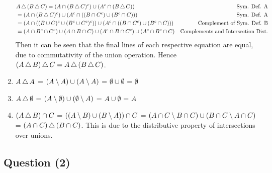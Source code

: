 \documentclass{article}
\begin{document}
\begin{enumerate}[label=(\roman*)]
        \begin{align*}
            & A \, \triangle \, (B \, \triangle \, C) = (A \cap (B \, \triangle \, C)^c) \cup (A^c \cap (B \, \triangle \, C)) & \text{Sym. Def. A} \\
            & = (A \cap (B \, \triangle \, C)^c) \cup (A^c \cap ((B \cap C^c) \cup (B^c \cap C))) & \text{Sym. Def. A} \\ 
            & = (A \cap ((B \cup C)^c \cup (B^c \cup C^c)^c)) \cup (A^c \cap ((B \cap C^c) \cup (B^c \cap C))) & \text{Complement of Sym. Def. B} \\ 
            & = (A \cap B^c \cap C^c) \cup (A \cap B \cap C) \cup (A^c \cap B \cap C^c) \cup (A^c \cap B^c \cap C) & \text{Complements and Intersection Dist.}
        \end{align*}
        Then it can be seen that the final lines of each respective equation are equal, due to commutativity of the union operation. Hence $(A \, \triangle \, B) \, \triangle \, C = A \, \triangle \, (B \, \triangle \, C)$.
    \item $A \, \triangle \, A$ = $(A \setminus A) \cup (A \setminus A)$ = $\emptyset \cup \emptyset$ = $\emptyset$
    \item $A \, \triangle \, \emptyset$ = $(A \setminus \emptyset) \cup (\emptyset \setminus A)$ = $A \cup \emptyset$ = $A$
    \item $(A \, \triangle \, B) \cap C$ = $((A \setminus B) \cup (B \setminus A)) \cap C$ = $(A \cap C \setminus B \cap C) \cup (B \cap C \setminus A \cap C)$ = $(A \cap C) \, \triangle \, (B \cap C)$. This is due to the distributive property of intersections over unions.
\end{enumerate}

\begin{center}
\section*{Question (2)}
\end{center}
\end{document}
